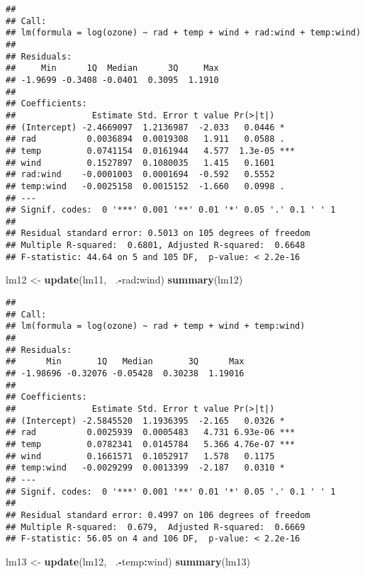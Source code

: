\documentclass[]{article}
\newenvironment{Shaded}{\begin{snugshade}}{\end{snugshade}}
\newcommand{\KeywordTok}[1]{\textcolor[rgb]{0.13,0.29,0.53}{\textbf{#1}}}
\newcommand{\StringTok}[1]{\textcolor[rgb]{0.31,0.60,0.02}{#1}}
\newcommand{\OperatorTok}[1]{\textcolor[rgb]{0.81,0.36,0.00}{\textbf{#1}}}
\newcommand{\NormalTok}[1]{#1}
\begin{document}
\begin{verbatim}
## 
## Call:
## lm(formula = log(ozone) ~ rad + temp + wind + rad:wind + temp:wind)
## 
## Residuals:
##     Min      1Q  Median      3Q     Max 
## -1.9699 -0.3408 -0.0401  0.3095  1.1910 
## 
## Coefficients:
##               Estimate Std. Error t value Pr(>|t|)    
## (Intercept) -2.4669097  1.2136987  -2.033   0.0446 *  
## rad          0.0036894  0.0019308   1.911   0.0588 .  
## temp         0.0741154  0.0161944   4.577  1.3e-05 ***
## wind         0.1527897  0.1080035   1.415   0.1601    
## rad:wind    -0.0001003  0.0001694  -0.592   0.5552    
## temp:wind   -0.0025158  0.0015152  -1.660   0.0998 .  
## ---
## Signif. codes:  0 '***' 0.001 '**' 0.01 '*' 0.05 '.' 0.1 ' ' 1
## 
## Residual standard error: 0.5013 on 105 degrees of freedom
## Multiple R-squared:  0.6801, Adjusted R-squared:  0.6648 
## F-statistic: 44.64 on 5 and 105 DF,  p-value: < 2.2e-16
\end{verbatim}

\begin{Shaded}
\begin{Highlighting}[]
\NormalTok{lm12 <-}\StringTok{ }\KeywordTok{update}\NormalTok{(lm11, }\OperatorTok{~}\NormalTok{.}\OperatorTok{-}\NormalTok{rad}\OperatorTok{:}\NormalTok{wind)}
\KeywordTok{summary}\NormalTok{(lm12)}
\end{Highlighting}
\end{Shaded}

\begin{verbatim}
## 
## Call:
## lm(formula = log(ozone) ~ rad + temp + wind + temp:wind)
## 
## Residuals:
##      Min       1Q   Median       3Q      Max 
## -1.98696 -0.32076 -0.05428  0.30238  1.19016 
## 
## Coefficients:
##               Estimate Std. Error t value Pr(>|t|)    
## (Intercept) -2.5845520  1.1936395  -2.165   0.0326 *  
## rad          0.0025939  0.0005483   4.731 6.93e-06 ***
## temp         0.0782341  0.0145784   5.366 4.76e-07 ***
## wind         0.1661571  0.1052917   1.578   0.1175    
## temp:wind   -0.0029299  0.0013399  -2.187   0.0310 *  
## ---
## Signif. codes:  0 '***' 0.001 '**' 0.01 '*' 0.05 '.' 0.1 ' ' 1
## 
## Residual standard error: 0.4997 on 106 degrees of freedom
## Multiple R-squared:  0.679,  Adjusted R-squared:  0.6669 
## F-statistic: 56.05 on 4 and 106 DF,  p-value: < 2.2e-16
\end{verbatim}

\begin{Shaded}
\begin{Highlighting}[]
\NormalTok{lm13 <-}\StringTok{ }\KeywordTok{update}\NormalTok{(lm12, }\OperatorTok{~}\NormalTok{.}\OperatorTok{-}\NormalTok{temp}\OperatorTok{:}\NormalTok{wind)}
\KeywordTok{summary}\NormalTok{(lm13)}
\end{Highlighting}
\end{Shaded}
\end{document}
